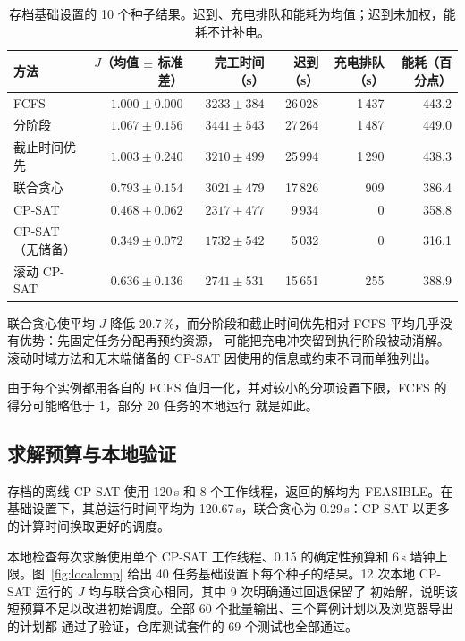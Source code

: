 \documentclass[11pt,a4paper,fontset=none]{ctexart}
\newcommand{\pct}{\,\%}
\begin{document}
\begin{table}[!htbp]
\centering\small
\caption{存档基础设置的 10 个种子结果。迟到、充电排队和能耗为均值；迟到未加权，能耗不计补电。}
\label{tab:archived}
\begin{tabular}{lrrrrr}
\toprule
方法 & $J$（均值 $\pm$ 标准差） & 完工时间（s） & 迟到（s） & 充电排队（s） & 能耗（百分点） \\
\midrule
FCFS & $1.000 \pm 0.000$ & $3233 \pm 384$ & 26\,028 & 1\,437 & 443.2 \\
分阶段 & $1.067 \pm 0.156$ & $3441 \pm 543$ & 27\,264 & 1\,487 & 449.0 \\
截止时间优先 & $1.003 \pm 0.240$ & $3210 \pm 499$ & 25\,994 & 1\,290 & 438.3 \\
联合贪心 & $0.793 \pm 0.154$ & $3021 \pm 479$ & 17\,826 & 909 & 386.4 \\
CP-SAT & $0.468 \pm 0.062$ & $2317 \pm 477$ & 9\,934 & 0 & 358.8 \\
CP-SAT（无储备） & $0.349 \pm 0.072$ & $1732 \pm 542$ & 5\,032 & 0 & 316.1 \\
滚动 CP-SAT & $0.636 \pm 0.136$ & $2741 \pm 531$ & 15\,651 & 255 & 388.9 \\
\bottomrule
\end{tabular}
\end{table}

联合贪心使平均 $J$ 降低 20.7\pct，而分阶段和截止时间优先相对 FCFS 平均几乎没有优势：先固定任务分配再预约资源，
可能把充电冲突留到执行阶段被动消解。滚动时域方法和无末端储备的 CP-SAT 因使用的信息或约束不同而单独列出。

由于每个实例都用各自的 FCFS 值归一化，并对较小的分项设置下限，FCFS 的得分可能略低于 1，部分 20 任务的本地运行
就是如此。

\subsection{求解预算与本地验证}

存档的离线 CP-SAT 使用 120\,s 和 8 个工作线程，返回的解均为 FEASIBLE。在基础设置下，其总运行时间平均为
120.67\,s，联合贪心为 0.29\,s：CP-SAT 以更多的计算时间换取更好的调度。

本地检查每次求解使用单个 CP-SAT 工作线程、0.15 的确定性预算和 6\,s 墙钟上限。图~\ref{fig:localcmp} 给出
40 任务基础设置下每个种子的结果。12 次本地 CP-SAT 运行的 $J$ 均与联合贪心相同，其中 9 次明确通过回退保留了
初始解，说明该短预算不足以改进初始调度。全部 60 个批量输出、三个算例计划以及浏览器导出的计划都
通过了验证，仓库测试套件的 69 个测试也全部通过。
\end{document}
